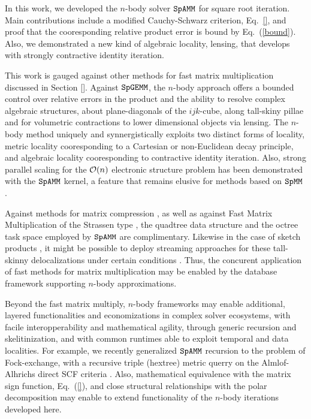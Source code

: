 \documentclass[letterpaper,twocolumn,amsmath,amsfont,amssymb,english,aps,jcp,preprintnumbers,groupaddress,nofootinbib,tightenlines,floatfix]{revtex4}
\theoremstyle{plain}
\theoremstyle{remark}
\theoremstyle{plain}
\begin{document}
In this work, we developed the $n$-body solver $\tt SpAMM$ for square root iteration.   
Main contributions include a modified Cauchy-Schwarz criterion, Eq.~\ref{}, and proof that the 
cooresponding relative product error is bound by Eq.~(\ref{bound}).  Also, we demonstrated a new kind of 
algebraic locality, {lensing}, that develops with strongly contractive identity iteration.

This work is gauged against other methods for fast matrix multiplication discussed in Section \ref{}. 
Against $\tt SpGEMM$, the $n$-body approach offers a bounded control over relative errors in 
the product and the ability to resolve complex algebraic structures, about plane-diagonals of the $ijk$-cube, 
along tall-skiny pillae and for volumetric contractions to lower dimensional objects via lensing. 
The $n$-body method uniquely and synnergistically exploits two distinct forms of locality, metric locality cooresponding to 
a Cartesian or non-Euclidean decay principle, and algebraic locality cooresponding to contractive identity iteration. 
Also, strong parallel scaling for the ${\cal{O}}(n)$ electronic structure problem has been demonstrated with the $\tt SpAMM$ kernel, 
a feature that remains elusive for methods based on $\tt SpMM$ \cite{Bowler}.

Against methods for matrix compression \cite{}, as well as against Fast Matrix Multiplication of the Strassen type \cite{}, 
the quadtree data structure and the octree task space employed by $\tt SpAMM$ are complimentary. 
Likewise in the case of sketch products \cite{}, it might be possible to 
deploy streaming approaches for these tall-skinny delocalizations under certain conditions \cite{}.
Thus, the concurent application of fast methods for matrix multiplication may be enabled by the database framework supporting 
$n$-body approximations.  

Beyond the fast matrix multiply, $n$-body frameworks may enable additional, layered functionalities and economizations 
in complex solver ecosystems, with facile interopperability and mathematical agility, 
through generic recursion and skelitinization, and with common runtimes able to exploit temporal and data localities.
For example, we recently generalized $\tt SpAMM$ recursion to the problem of Fock-exchange, with a recursive triple (hextree) 
metric querry on the Almlof-Alhrichs direct SCF criteria \cite{}.  
Also, mathematical equivalence with the matrix sign function, Eq.~(\ref{}), and close structural relationships with the 
polar decomposition may enable to extend functionality of the $n$-body iterations developed here. 
\end{document}
